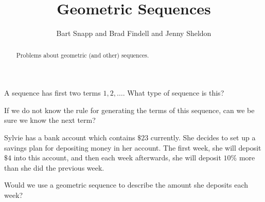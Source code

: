 \documentclass[nooutcomes]{ximera}
\title{Geometric Sequences}
\author{Bart Snapp and Brad Findell and Jenny Sheldon}
\begin{document}
\begin{abstract}
Problems about geometric (and other) sequences.
\end{abstract}
\maketitle





\begin{problem}
A sequence has first two terms $1, 2, \dots$.  What type of sequence is this?
\begin{multipleChoice}
\end{multipleChoice}
\begin{hint}
	If we do not know the rule for generating the terms of this sequence, can we be sure we know the next term?
\end{hint}
\end{problem}



\begin{problem}
Sylvie has a bank account which contains $\$23$ currently.  She decides to set up a savings plan for depositing money in her account.  The first week, she will deposit $\$4$ into this account, and then each week afterwards, she will deposit $10\%$ more than she did the previous week.  

Would we use a geometric sequence to describe the amount she deposits each week?
\begin{multipleChoice}
\end{multipleChoice}

\end{problem}
\end{document}
